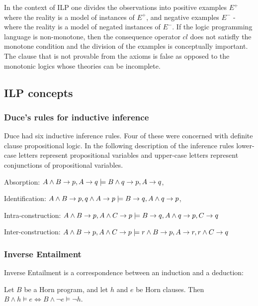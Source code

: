 In the context of ILP one divides the observations into positive examples $E^+$ where the reality is a model of instances of $E^+$, and negative examples $E^-$ - where the reality is a model of negated instances of $E^-$. If the logic programming language is non-monotone, then the consequence operator $cl$ does not satisfly the monotone condition and the division of the examples is conceptually important. The clause that is not provable from the axioms is false as opposed to the monotonic logics whose theories can be incomplete.

\subsection{ILP concepts}

\subsubsection{Duce's rules for inductive inference\cite{muggleton1995}}
Duce had six inductive inference rules. Four of these were concerned with definite clause propositional logic. In the following description of the inference rules
lower-case letters represent propositional variables and upper-case letters represent conjunctions of propositional variables.

Absorption: $A \wedge B \to p, A \to q \models B \wedge q \to p, A \to q$,

Identification: $A \wedge B \to p, q \wedge A \to p
\models B \to q, A \wedge q \to p$,

Intra-construction: $A \wedge B \to p, A \wedge C \to p
\models B \to q, A \wedge q \to p, C \to q$

Inter-construction: $A \wedge B \to p, A \wedge C \to p
\models r \wedge B \to p, A \to r, r \wedge C \to q$

\subsubsection{Inverse Entailment}
Inverse Entailment is a correspondence between an induction and a deduction:
\begin{thm}\cite{kimber2011}
Let $B$ be a Horn program, and let $h$ and $e$ be
Horn clauses. Then $B \wedge h \models e \iff B \wedge \neg e \models \neg h$.
\end{thm}

